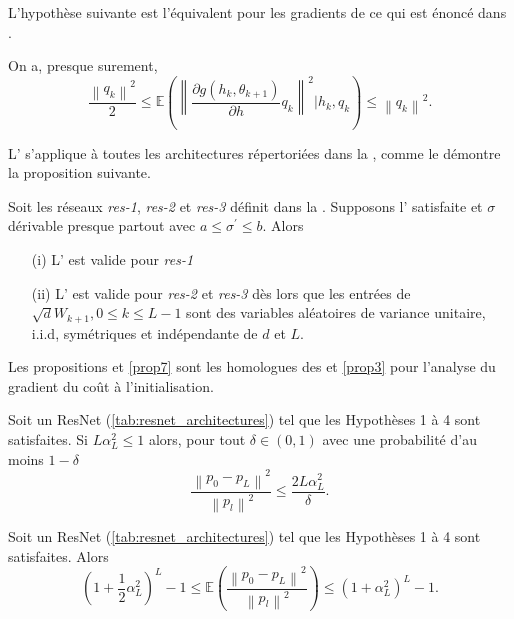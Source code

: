 L'hypothèse suivante est l'équivalent pour les gradients de ce qui est énoncé dans .
\begin{assumption}\label{H4}
    On a, presque surement, 
    \[
        \frac{\left\| q_k \right\| ^2}{2} \leq \mathbb{E}(\left\| \frac{\partial g(h_k, \theta _{k+1})}{\partial h} q_k  \right\| ^2 | h_k, q_k ) \leq \left\| q_k \right\| ^2
    .\]
\end{assumption}

L' s'applique à toutes les architectures répertoriées dans la , comme le démontre la proposition suivante.
\begin{proposition}\label{prop5}
    Soit les réseaux \textit{res-1}, \textit{res-2} et \textit{res-3} définit dans la . Supposons l' satisfaite et $ \sigma  $ dérivable presque partout avec $ a \leq \sigma ^\prime \leq b $. Alors
    \begin{itemize}
        \item [(i)] L' est valide pour \textit{res-1}
        \item [(ii)] L' est valide pour \textit{res-2} et \textit{res-3} dès lors que les entrées de $ \sqrt{d} W_{k+1}, 0 \leq k \leq L-1 $ sont des variables aléatoires de variance unitaire, i.i.d, symétriques et indépendante de $ d $ et $ L $.
    \end{itemize}
\end{proposition}

Les propositions  et \ref{prop7} sont les homologues des  et \ref{prop3} pour l'analyse du gradient du coût à l'initialisation.

\begin{proposition}\label{prop6}
    Soit un ResNet (\ref{tab:resnet_architectures}) tel que les Hypothèses 1 à 4 sont satisfaites. Si $ L \alpha _L ^2 \leq 1 $ alors, pour tout $ \delta \in (0,1) $ avec une probabilité d'au moins $ 1 - \delta  $ 
    \[
        \frac{\left\| p_0 - p_L \right\| ^2 }{\left\| p_l \right\| ^2 } \leq \frac{2 L \alpha _L ^2}{\delta }
    .\]
\end{proposition}

\begin{proposition}\label{prop7}
    Soit un ResNet (\ref{tab:resnet_architectures}) tel que les Hypothèses 1 à 4 sont satisfaites. Alors 
    \[
        (1 + \frac{1}{2} \alpha _L ^2)^L - 1 \leq \mathbb{E}( \frac{\left\| p_0 - p_L \right\| ^2 }{\left\| p_l \right\| ^2 } ) \leq (1 + \alpha _L ^2)^L - 1
    .\]
\end{proposition}

